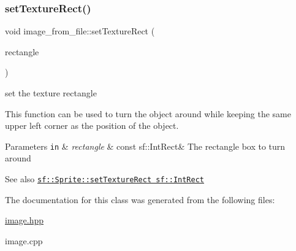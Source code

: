 \subsubsection{\texorpdfstring{set\+Texture\+Rect()}{setTextureRect()}}
{\footnotesize\ttfamily void image\+\_\+from\+\_\+file\+::set\+Texture\+Rect (\begin{DoxyParamCaption}\item[{const sf\+::\+Int\+Rect \&}]{rectangle }\end{DoxyParamCaption})}



set the texture rectangle 

This function can be used to turn the object around while keeping the same upper left corner as the position of the object.


\begin{DoxyParams}[1]{Parameters}
\mbox{\tt in}  & {\em rectangle} & const sf\+::\+Int\+Rect\& The rectangle box to turn around \\
\hline
\end{DoxyParams}
\begin{DoxySeeAlso}{See also}
\href{https://www.sfml-dev.org/documentation/2.0/classsf_1_1Sprite.php#a3fefec419a4e6a90c0fd54c793d82ec2 }{\tt sf\+::\+Sprite\+::set\+Texture\+Rect sf\+::\+Int\+Rect} 
\end{DoxySeeAlso}


The documentation for this class was generated from the following files\+:\begin{DoxyCompactItemize}
\item 
\hyperlink{image_8hpp}{image.\+hpp}\item 
image.\+cpp\end{DoxyCompactItemize}
